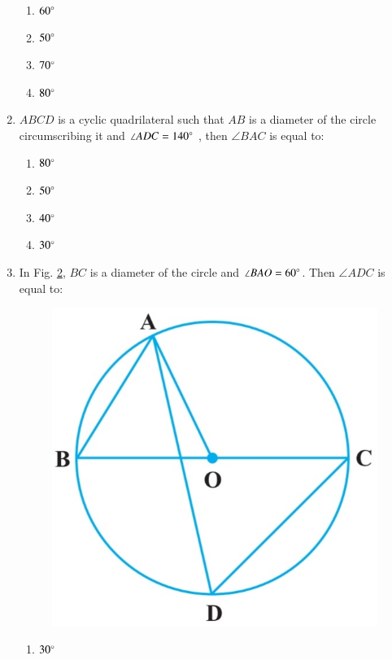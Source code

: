 \documentclass{article}
\begin{document}
\begin{enumerate}
\begin{figure}[H]
\caption{}
\label{fig:10.7}
\end{figure}
\begin{enumerate}
\item $60\degree$
\item $50\degree$
\item $70\degree$
\item $80\degree$
\end{enumerate}
\item $ABCD$ is a cyclic quadrilateral such that $AB$ is a diameter of the circle circumscribing it and $\angle ADC = 140\degree$ , then $\angle BAC$ is equal to:
\begin{enumerate}
\item $80\degree$
\item $50\degree$
\item $40\degree$
\item $30\degree$
\end{enumerate}
\item In Fig. \ref{fig:10.8}, $BC$ is a diameter of the circle and $\angle BAO = 60\degree$. Then $\angle ADC$ is equal to:
\begin{figure}[H]
\centering
\includegraphics[width=\columnwidth]{figs/10.8.jpg}
\caption{}
\label{fig:10.8}
\end{figure}
\begin{enumerate}
\item $30\degree$

\end{enumerate}
\end{enumerate}
\end{document}

